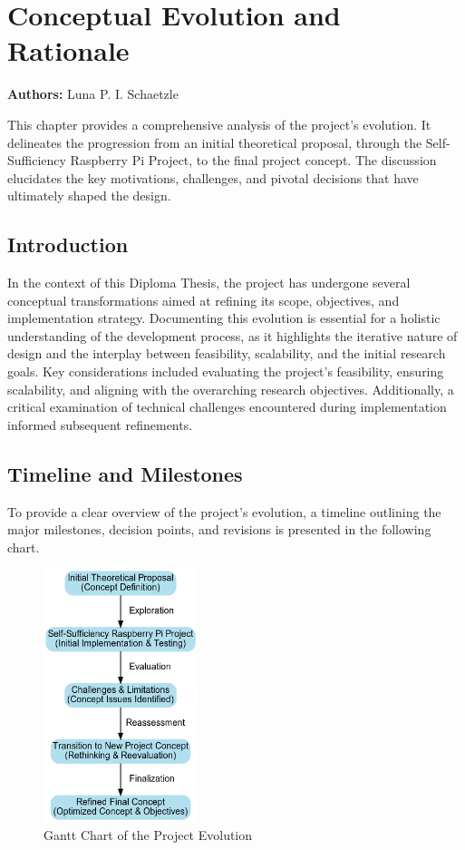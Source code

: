 \chapter{Conceptual Evolution and Rationale}
\label{chap:Conceptual_Evolution_and_Rationale}
\textbf{Authors:} Luna P. I. Schaetzle

This chapter provides a comprehensive analysis of the project's evolution. It delineates the progression from an initial theoretical proposal, through the Self-Sufficiency Raspberry Pi Project, to the final project concept. The discussion elucidates the key motivations, challenges, and pivotal decisions that have ultimately shaped the design.

\section{Introduction}

In the context of this Diploma Thesis, the project has undergone several conceptual transformations aimed at refining its scope, objectives, and implementation strategy. Documenting this evolution is essential for a holistic understanding of the development process, as it highlights the iterative nature of design and the interplay between feasibility, scalability, and the initial research goals. Key considerations included evaluating the project's feasibility, ensuring scalability, and aligning with the overarching research objectives. Additionally, a critical examination of technical challenges encountered during implementation informed subsequent refinements.

\section{Timeline and Milestones}

To provide a clear overview of the project's evolution, a timeline outlining the major milestones, decision points, and revisions is presented in the following chart.
\begin{figure}[H]
    \centering
    \includegraphics[width=0.4\textwidth]{figures/concept_change_flowchart.png}
    \caption{Gantt Chart of the Project Evolution}
    \label{fig:GanttChart}
\end{figure}

